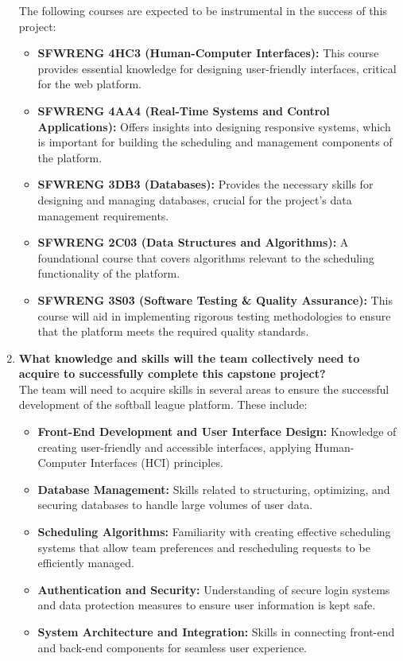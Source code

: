 \begin{enumerate}
    The following courses are expected to be instrumental in the success of this project:
    \begin{itemize}
        \item \textbf{SFWRENG 4HC3 (Human-Computer Interfaces):} This course provides essential knowledge for designing user-friendly interfaces, critical for the web platform.
        \item \textbf{SFWRENG 4AA4 (Real-Time Systems and Control Applications):} Offers insights into designing responsive systems, which is important for building the scheduling and management components of the platform.
        \item \textbf{SFWRENG 3DB3 (Databases):} Provides the necessary skills for designing and managing databases, crucial for the project’s data management requirements.
        \item \textbf{SFWRENG 2C03 (Data Structures and Algorithms):} A foundational course that covers algorithms relevant to the scheduling functionality of the platform.
        \item \textbf{SFWRENG 3S03 (Software Testing \& Quality Assurance):} This course will aid in implementing rigorous testing methodologies to ensure that the platform meets the required quality standards.
    \end{itemize}
    
    \item \textbf{What knowledge and skills will the team collectively need to acquire to successfully complete this capstone project?} \\
    The team will need to acquire skills in several areas to ensure the successful development of the softball league platform. These include:
    \begin{itemize}
        \item \textbf{Front-End Development and User Interface Design:} Knowledge of creating user-friendly and accessible interfaces, applying Human-Computer Interfaces (HCI) principles.
        \item \textbf{Database Management:} Skills related to structuring, optimizing, and securing databases to handle large volumes of user data.
        \item \textbf{Scheduling Algorithms:} Familiarity with creating effective scheduling systems that allow team preferences and rescheduling requests to be efficiently managed.
        \item \textbf{Authentication and Security:} Understanding of secure login systems and data protection measures to ensure user information is kept safe.
        \item \textbf{System Architecture and Integration:} Skills in connecting front-end and back-end components for seamless user experience.
    \end{itemize}


\end{enumerate}
